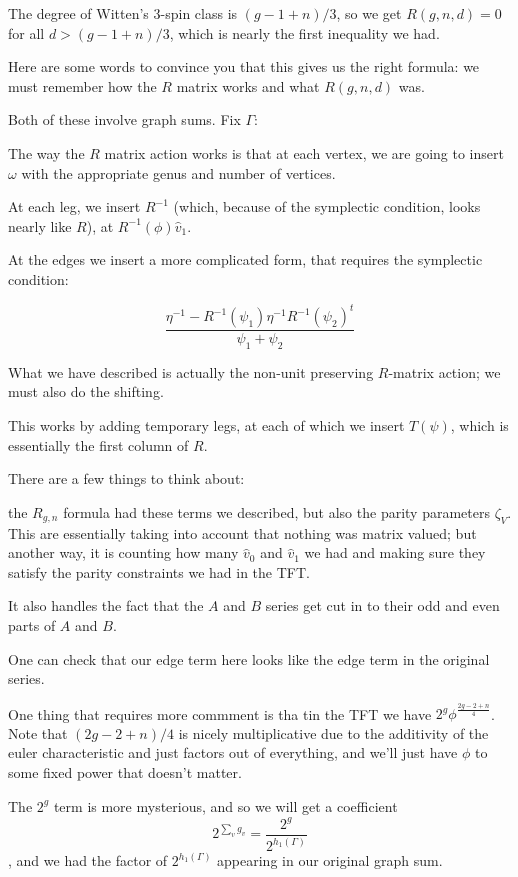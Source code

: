 \documentclass{amsart}
\theoremstyle{definition}
\begin{document}
The degree of Witten's 3-spin class is $(g-1+n)/3$, so we get $R(g,n,d)=0$ for all $d>(g-1+n)/3$, which is nearly the first inequality we had.

Here are some words to convince you that this gives us the right formula: we must remember how the $R$ matrix works and what $R(g,n,d)$ was.

Both of these involve graph sums.  Fix $\Gamma$:

The way the $R$ matrix action works is that at each vertex, we are going to insert $\omega$ with the appropriate genus and number of vertices.

At each leg, we insert $R^{-1}$ (which, because of the symplectic condition, looks nearly like $R$), at $R^{-1}(\phi)\hat{v}_1$.

At the edges we insert a more complicated form, that requires the symplectic condition:

$$\frac{\eta^{-1}-R^{-1}(\psi_1)\eta^{-1}R^{-1}(\psi_2)^t}{\psi_1+\psi_2}$$

What we have described is actually the non-unit preserving $R$-matrix action; we must also do the shifting.

This works by adding temporary legs, at each of which we insert $T(\psi)$, which is essentially the first column of $R$.

There are a few things to think about:

the $R_{g,n}$ formula had these terms we described, but also the parity parameters $\zeta_V$.  This are essentially taking into account that nothing was matrix valued; but another way, it is counting how many $\hat{v}_0$ and $\hat{v}_1$ we had and making sure they satisfy the parity constraints we had in the TFT.

It also handles the fact that the $A$ and $B$ series get cut in to their odd and even parts of $A$ and $B$.

One can check that our edge term here looks like the edge term in the original series.

One thing that requires more commment is tha tin the TFT we have $2^g\phi^{\frac{2g-2+n}{4}}$.  Note that $(2g-2+n)/4$ is nicely multiplicative due to the additivity of the euler characteristic and just factors out of everything, and we'll just have $\phi$ to some fixed power that doesn't matter.

The $2^g$ term is more mysterious, and so we will get a coefficient 
$$2^{\sum_v g_v}=\frac{2^g}{2^{h_1(\Gamma)}}$$, and we had the factor of $2^{h_1(\Gamma)}$ appearing in our original graph sum.
\end{document}
